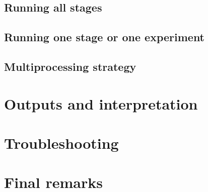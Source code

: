 \documentclass[11pt,a4paper]{article}
\begin{document}
\subsection{Running all stages}

\subsection{Running one stage or one experiment}

\subsection{Multiprocessing strategy}

\section{Outputs and interpretation}

\section{Troubleshooting}

\section{Final remarks}
\end{document}

